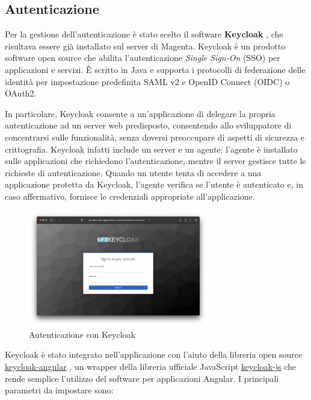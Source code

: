 \subsection{Autenticazione}\label{sec:autenticazione}
Per la gestione dell'autenticazione è stato scelto il software \textbf{Keycloak} \cite{keycloak}, che risultava essere già installato sul server di Magenta. Keycloak è un prodotto software open source che abilita l'autenticazione \textit{Single Sign-On} (SSO) per applicazioni e servizi. È scritto in Java e supporta i protocolli di federazione delle identità per impostazione predefinita SAML v2 e OpenID Connect (OIDC) o OAuth2. \cite{keycloak}

In particolare, Keycloak consente a un'applicazione di delegare la propria autenticazione ad un server web predisposto, consentendo allo sviluppatore di concentrarsi sulle funzionalità, senza doversi preoccupare di aspetti di sicurezza e crittografia. Keycloak infatti include un server e un agente: l'agente è installato sulle applicazioni che richiedono l'autenticazione, mentre il server gestisce tutte le richieste di autenticazione. Quando un utente tenta di accedere a una applicazione protetta da Keycloak, l'agente verifica se l'utente è autenticato e, in caso affermativo, fornisce le credenziali appropriate all'applicazione.

\begin{figure}[H]
\centering
\includegraphics[width=0.70\textwidth,height=\textheight,keepaspectratio]{img/keycloak}
\caption{Autenticazione con Keycloak}
\label{fig:keycloak}
\end{figure}

Keycloak è stato integrato nell'applicazione con l'aiuto della libreria open source \url{keycloak-angular} \cite{keycloak-angular}, un wrapper della libreria ufficiale JavaScript \url{keycloak-js} \cite{keycloak-js} che rende semplice l'utilizzo del software per applicazioni Angular. I principali parametri da impostare sono:


